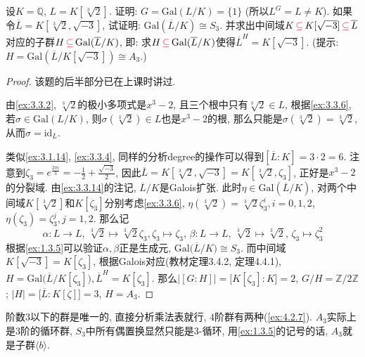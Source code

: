 \begin{problem}\label{ex:3.4.2}
    设$K = \mathbb{Q},\, L = K[\sqrt[3]{2}]$. 证明: $G = \mathrm{Gal}(L/K)=\{1\}$ (所以$L^G = L \neq K$). 如果令$\overline{L} = K[\sqrt[3]{2}, \sqrt{-3}]$, 试证明: $\mathrm{Gal}(\overline{L}/K) \cong S_3$. 并求出中间域$K \,\textcolor{red}{\subseteq}\, K[\sqrt{-3}] \,\textcolor{red}{\subseteq}\, \overline{L}$对应的子群$H \,\textcolor{red}{\subseteq}\, \mathrm{Gal}(\overline L/K)$, 即: 求$H \,\textcolor{red}{\subseteq}\, \mathrm{Gal}(\overline L/K)$使得$\overline{L}^{H} = K[\sqrt{-3}]$. (提示: $H = \mathrm{Gal}(\overline L/K[\sqrt{-3}]) \cong A_3$.)
\end{problem}

\begin{proof}
    该题的后半部分已在上课时讲过.

    由\ref{ex:3.3.2}, $\sqrt[3]{2}$的极小多项式是$x^3 - 2$, 且三个根中只有$\sqrt[3]{2} \in L$, 根据\ref{ex:3.3.6}, 若$\sigma \in \mathrm{Gal}(L/K)$, 则$\sigma(\sqrt[3]{2}) \in L$也是$x^3 - 2$的根, 那么只能是$\sigma(\sqrt[3]{2}) = \sqrt[3]{2}$, 从而$\sigma = \mathrm{id}_L$.

    类似\ref{ex:3.1.14}, \ref{ex:3.3.4}, 同样的分析degree的操作可以得到$[\overline{L}:K] = 3 \cdot 2 = 6$. 注意到$\zeta_3 = e^{\frac{2\pi i}{3}} = -\frac{1}{2} + \frac{\sqrt{-3}}{2}$, 因此$\overline{L} = K[\sqrt[3]{2}, \sqrt{-3}] = K[\sqrt[3]{2}, \zeta_3]$, 正好是$x^3 - 2$的分裂域. 由\ref{ex:3.3.14}的注记, $\overline{L}/K$是Galois扩张. 此时$\eta \in \mathrm{Gal}(\overline{L}/K)$, 对两个中间域$K[\sqrt[3]{2}]$和$K[\zeta_3]$分别考虑\ref{ex:3.3.6}, $\eta(\sqrt[3]{2}) = \sqrt[3]{2}\zeta_3^i, i = 0, 1, 2$, $\eta(\zeta_3) = \zeta_3^j, j = 1, 2$. 那么记
    \[
        \alpha:L \to L,\, \sqrt[3]{2} \mapsto \sqrt[3]{2}\zeta_3, \zeta_3 \mapsto \zeta_3,\, \beta:L \to L,\, \sqrt[3]{2} \mapsto \sqrt[3]{2},\, \zeta_3 \mapsto \zeta_3^2
    \]
    根据\ref{ex:1.3.5}可以验证$\alpha, \beta$正是生成元, $\mathrm{Gal}\bigl(\overline{L}/K\bigr) \cong S_3$. 而中间域$K[\sqrt{-3}] = K[\zeta_3]$, 根据Galois对应(教材定理3.4.2, 定理4.4.1), $H = \mathrm{Gal}\bigl(\overline{L}/K[\zeta_3]\bigr), \overline{L}^H = K[\zeta_3]$. 那么$\bigl|[G:H]\bigr| = \bigl[K[\zeta_3]:K\bigr] = 2$, $G/H = \mathbb{Z}/2\mathbb{Z}$; $|H| = \bigl[\overline{L}:K[\zeta]\bigr] = 3$, $H = A_3$. 
\end{proof}

\begin{remark}
    阶数$3$以下的群是唯一的, 直接分析乘法表就行, $4$阶群有两种(\ref{ex:4.2.7}). $A_3$实际上是$3$阶的循环群, $S_3$中所有偶置换显然只能是$3$-循环, 用\ref{ex:1.3.5}的记号的话, $A_3$就是子群$\langle b \rangle$.
\end{remark}

